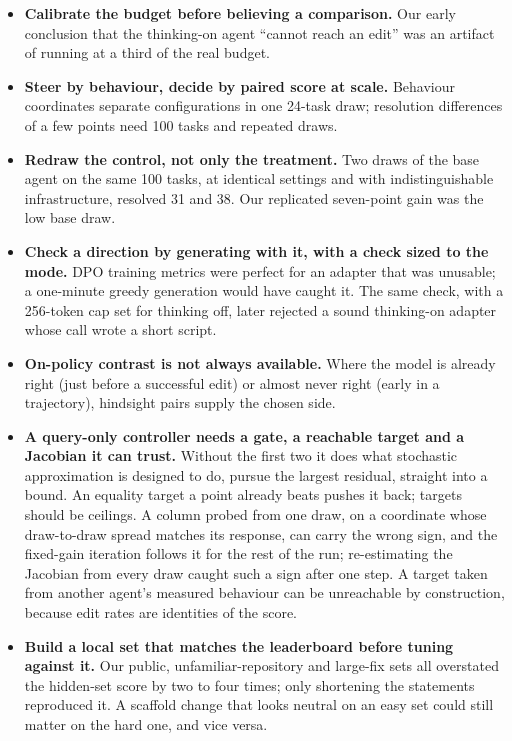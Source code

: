 \documentclass[11pt]{article}
\begin{document}
\begin{itemize}
  \item \textbf{Calibrate the budget before believing a comparison.} Our early conclusion that the thinking-on agent ``cannot reach an edit'' was an artifact of running at a third of the real budget.
  \item \textbf{Steer by behaviour, decide by paired score at scale.} Behaviour coordinates separate configurations in one 24-task draw; resolution differences of a few points need 100 tasks and repeated draws.
  \item \textbf{Redraw the control, not only the treatment.} Two draws of the base agent on the same 100 tasks, at identical settings and with indistinguishable infrastructure, resolved 31 and 38. Our replicated seven-point gain was the low base draw.
  \item \textbf{Check a direction by generating with it, with a check sized to the mode.} DPO training metrics were perfect for an adapter that was unusable; a one-minute greedy generation would have caught it. The same check, with a 256-token cap set for thinking off, later rejected a sound thinking-on adapter whose call wrote a short script.
  \item \textbf{On-policy contrast is not always available.} Where the model is already right (just before a successful edit) or almost never right (early in a trajectory), hindsight pairs supply the chosen side.
  \item \textbf{A query-only controller needs a gate, a reachable target and a Jacobian it can trust.} Without the first two it does what stochastic approximation is designed to do, pursue the largest residual, straight into a bound. An equality target a point already beats pushes it back; targets should be ceilings. A column probed from one draw, on a coordinate whose draw-to-draw spread matches its response, can carry the wrong sign, and the fixed-gain iteration follows it for the rest of the run; re-estimating the Jacobian from every draw caught such a sign after one step. A target taken from another agent's measured behaviour can be unreachable by construction, because edit rates are identities of the score.
  \item \textbf{Build a local set that matches the leaderboard before tuning against it.} Our public, unfamiliar-repository and large-fix sets all overstated the hidden-set score by two to four times; only shortening the statements reproduced it. A scaffold change that looks neutral on an easy set could still matter on the hard one, and vice versa.

\end{itemize}
\end{document}
